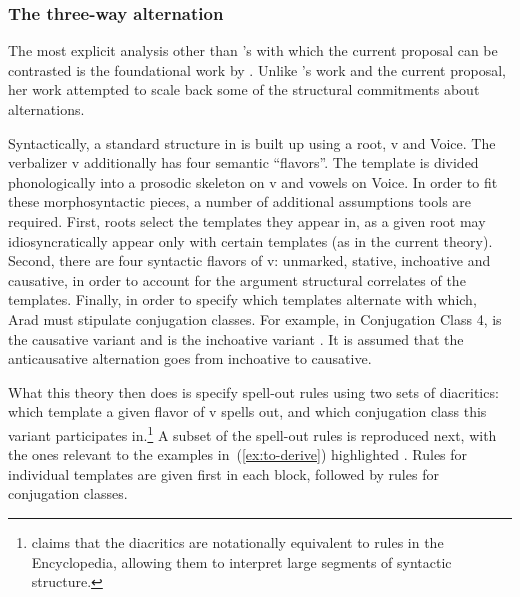		\subsubsection{The three-way alternation}
The most explicit analysis other than \citeauthor{doron03}'s with which the current proposal can be contrasted is the foundational work by \cite{arad03,arad05}. Unlike \citeauthor{doron03}'s work and the current proposal, her work attempted to scale back some of the structural commitments about alternations.

Syntactically, a standard structure in \cite{arad05} is built up using a root, v and Voice. The verbalizer v additionally has four semantic ``flavors''. The template is divided phonologically into a prosodic skeleton on v and vowels on Voice. In order to fit these morphosyntactic pieces, a number of additional assumptions tools are required. First, roots select the templates they appear in, as a given root may idiosyncratically appear only with certain templates (as in the current theory). Second, there are four syntactic flavors of v: unmarked, stative, inchoative and causative, in order to account for the argument structural correlates of the templates. Finally, in order to specify which templates alternate with which, Arad must stipulate conjugation classes. For example, in Conjugation Class 4, {\tpie} is the causative variant and {\thit} is the inchoative variant \citep[220]{arad05}. It is assumed that the anticausative alternation goes from inchoative to causative.

What this theory then does is specify spell-out rules using two sets of diacritics: which template a given flavor of v spells out, and which conjugation class this variant participates in.\footnote{\citet[227ff41]{arad05} claims that the diacritics are notationally equivalent to rules in the Encyclopedia, allowing them to interpret large segments of syntactic structure.} A subset of the spell-out rules is reproduced next, with the ones relevant to the examples in~(\ref{ex:to-derive}) highlighted \citep[230--231]{arad05}. Rules for individual templates are given first in each block, followed by rules for conjugation classes.

